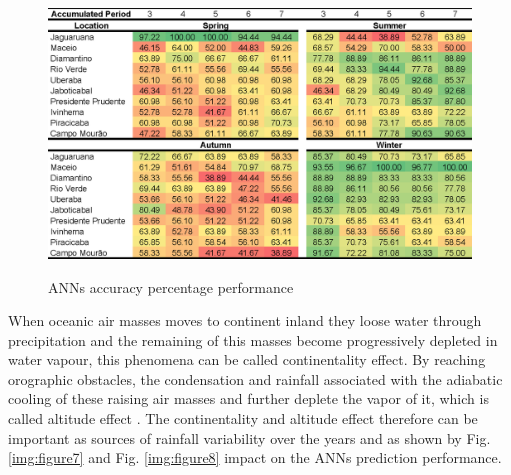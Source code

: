 \begin{figure}[htb!]
 \centering
  \caption{ANNs accuracy percentage performance}
 \includegraphics[scale=0.9]{capitulo_3/general_table}
 \label{img:figure6}
\end{figure}

When oceanic air masses moves to continent inland they loose water through precipitation and the remaining of this masses become progressively depleted in water vapour, this phenomena can be called continentality effect. By reaching orographic obstacles, the condensation and rainfall associated with the adiabatic cooling of these raising air masses and further deplete the vapor of it, which is called altitude effect \cite{vuille2003modeling}. The continentality and altitude effect therefore can be important as sources of rainfall variability over the years and as shown by Fig.\ref{img:figure7} and Fig. \ref{img:figure8} impact on the ANNs prediction performance. 


